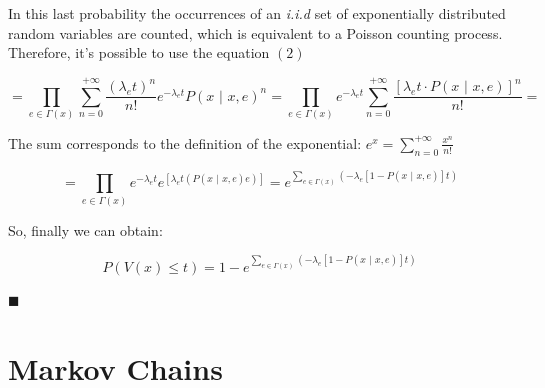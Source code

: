\documentclass[12pt,a4paper]{article}
\begin{document}
\bigskip\noindent
In this last probability the occurrences of an \textit{i.i.d} set of exponentially distributed random variables are counted, which is equivalent to a Poisson counting process. Therefore, it's possible to use the equation $(2)$ 

\begin{Large}
$$
=\prod_{e\in\Gamma(x)}{\sum_{n=0}^{+\infty}{
\frac{\left(\lambda_e t\right)^{n}}{n!} e^{-\lambda_e t} P\left( x\hspace{4pt}|\hspace{4pt}x,e\right)^{n}}}
=\prod_{e\in\Gamma(x)}{e^{-\lambda_e t}\sum_{n=0}^{+\infty}{
\frac{\left[\lambda_e t\cdot P\left(x\hspace{4pt}|\hspace{4pt}x,e\right)\right]^n}{n!}
}}=
$$
\end{Large}

\medskip
\noindent
The sum corresponds to the definition of the exponential: $e^x=\sum_{n=0}^{+\infty}{\frac{x^n}{n!}}$

\begin{Large}
$$
=\prod_{e\in\Gamma(x)}{e^{-\lambda_e t}
e^{\left[\lambda_e t\left(P\left(x\hspace{4pt}|\hspace{4pt}x,e\right)e\right)\right]}
}
=e^{\sum_{e\in\Gamma(x)}{\left(-\lambda_e
\left[
1-P\left(x\hspace{4pt}|\hspace{4pt}x,e\right)
\right]t\right)
}}
$$
\end{Large}

\medskip\noindent
So, finally we can obtain:
\begin{Large}
$$
P\left(V(x)\leq t\right)=1-
e^{\sum_{e\in\Gamma(x)}{\left(-\lambda_e
\left[
1-P\left(x\hspace{4pt}|\hspace{4pt}x,e\right)
\right]t\right)
}}
$$
\end{Large}
\begin{flushright}
$\blacksquare$
\end{flushright}
\newpage
\section{Markov Chains}
\end{document}
